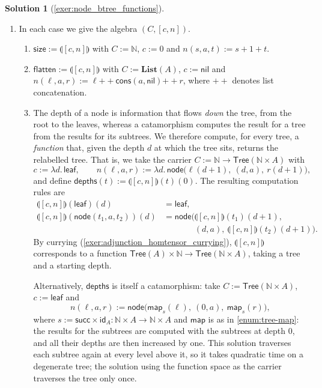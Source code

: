 \documentclass[a4paper,11pt, oneside,titlepage=false]{scrbook}
\theoremstyle{plain}
\theoremstyle{definition}
\newtheorem{solution}[thm]{Solution}
\newcommand{\cfont}[1]{\ensuremath{\mathsf{#1}}}
\newcommand{\Catb}[1]{\mathbf{#1}}
\newcommand{\List}{\Catb{List}}
\newcommand{\Id}[1][]{\cfont{id}_{#1}}
\newcommand{\catam}[1]{\llparenthesis #1 \rrparenthesis}
\newcommand{\nil}{\ensuremath{\mathsf{nil}}}
\newcommand{\cons}{\ensuremath{\mathsf{cons}}}
\newcommand{\NN}{\ensuremath{\mathbb{N}}}
\newcommand{\Succ}{\ensuremath{\mathsf{succ}}}
\begin{document}
\begin{solution}[\cref{exer:node_btree_functions}]
\begin{enumerate}
  \item In each case we give the algebra $(C, [c, n])$.
    \begin{enumerate}
    \item $\mathsf{size} := \catam{[c, n]}$ with $C := \NN$, $c := 0$ and $n(s, a, t) := s + 1 + t$.
    \item $\mathsf{flatten} := \catam{[c, n]}$ with $C := \List(A)$, $c := \nil$ and
      $n(\ell, a, r) := \ell \mathbin{+\!\!+} \cons(a, \nil) \mathbin{+\!\!+} r$,
      where $\mathbin{+\!\!+}$ denotes list concatenation.
    \item The depth of a node is information that flows \emph{down} the tree, from the root to the leaves, whereas a catamorphism computes the result for a tree from the results for its subtrees.
      We therefore compute, for every tree, a \emph{function} that, given the depth $d$ at which the tree sits, returns the relabelled tree.
      That is, we take the carrier $C := \NN \to \mathsf{Tree}(\NN \times A)$ with
      \[
        c := \lambda d.\, \mathsf{leaf},
        \qquad
        n(\ell, a, r) := \lambda d.\, \mathsf{node}\big(\ell(d+1),\ (d, a),\ r(d+1)\big),
      \]
      and define $\mathsf{depths}(t) := \catam{[c,n]}(t)(0)$.
      The resulting computation rules are
      \begin{align*}
        \catam{[c,n]}(\mathsf{leaf})(d) &= \mathsf{leaf}, \\
        \catam{[c,n]}(\mathsf{node}(t_1, a, t_2))(d) &= \mathsf{node}\big(\catam{[c,n]}(t_1)(d+1), \\
          &\phantom{{}= \mathsf{node}\big(} (d, a),\ \catam{[c,n]}(t_2)(d+1)\big).
      \end{align*}
      By currying (\cref{exer:adjunction_homtensor_currying}), $\catam{[c,n]}$ corresponds to a function $\mathsf{Tree}(A) \times \NN \to \mathsf{Tree}(\NN \times A)$, taking a tree and a starting depth.

      Alternatively, $\mathsf{depths}$ is itself a catamorphism: take $C := \mathsf{Tree}(\NN \times A)$, $c := \mathsf{leaf}$ and
      \[ n(\ell, a, r) := \mathsf{node}\big(\mathsf{map}_{s}(\ell),\ (0, a),\ \mathsf{map}_{s}(r)\big), \]
      where $s := \Succ \times \Id[A] : \NN \times A \to \NN \times A$ and $\mathsf{map}$ is as in \cref{enum:tree-map}: the results for the subtrees are computed with the subtrees at depth $0$, and all their depths are then increased by one.
      This solution traverses each subtree again at every level above it, so it takes quadratic time on a degenerate tree; the solution using the function space as the carrier traverses the tree only once.
    \end{enumerate}


\end{enumerate}
\end{solution}
\end{document}
